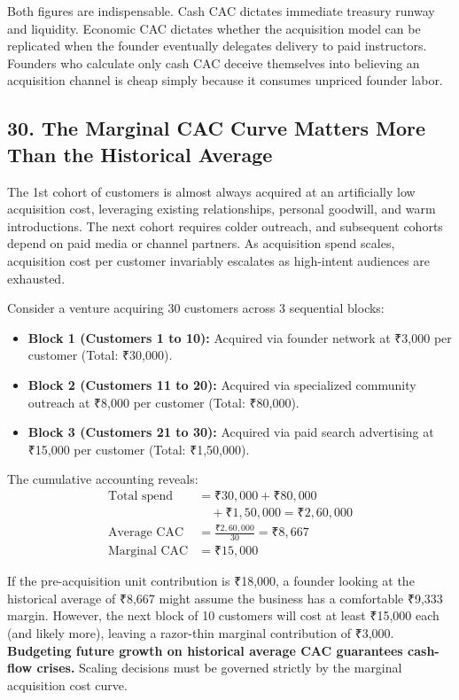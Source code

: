 Both figures are indispensable. Cash CAC dictates immediate treasury runway and liquidity. Economic CAC dictates whether the acquisition model can be replicated when the founder eventually delegates delivery to paid instructors. Founders who calculate only cash CAC deceive themselves into believing an acquisition channel is cheap simply because it consumes unpriced founder labor.

\subsection*{30. The Marginal CAC Curve Matters More Than the Historical Average}

The 1st cohort of customers is almost always acquired at an artificially low acquisition cost, leveraging existing relationships, personal goodwill, and warm introductions. The next cohort requires colder outreach, and subsequent cohorts depend on paid media or channel partners. As acquisition spend scales, acquisition cost per customer invariably escalates as high-intent audiences are exhausted.

Consider a venture acquiring 30 customers across 3 sequential blocks:
\begin{itemize}[leftmargin=*,itemsep=1pt]
  \item \textbf{Block 1 (Customers 1 to 10):} Acquired via founder network at ₹3,000 per customer (Total: ₹30,000).
  \item \textbf{Block 2 (Customers 11 to 20):} Acquired via specialized community outreach at ₹8,000 per customer (Total: ₹80,000).
  \item \textbf{Block 3 (Customers 21 to 30):} Acquired via paid search advertising at ₹15,000 per customer (Total: ₹1,50,000).
\end{itemize}

The cumulative accounting reveals:
\begin{align*}
  \text{Total spend} &= \text{₹}30,000 + \text{₹}80,000 \\
  &\quad + \text{₹}1,50,000 = \text{₹}2,60,000 \\
  \text{Average CAC} &= \frac{\text{₹}2,60,000}{30} = \text{₹}8,667 \\
  \text{Marginal CAC} &= \text{₹}15,000
\end{align*}

If the pre-acquisition unit contribution is ₹18,000, a founder looking at the historical average of ₹8,667 might assume the business has a comfortable ₹9,333 margin. However, the next block of 10 customers will cost at least ₹15,000 each (and likely more), leaving a razor-thin marginal contribution of ₹3,000. \textbf{Budgeting future growth on historical average CAC guarantees cash-flow crises.} Scaling decisions must be governed strictly by the marginal acquisition cost curve.

